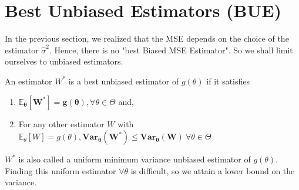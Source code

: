 \documentclass[12pt]{report}
\begin{document}
\section{Best Unbiased Estimators (BUE)}
In the previous section, we realized that the MSE depends on the choice of the estimator $\hat{\sigma}^2$. Hence, there is no "best Biased MSE Estimator". So we shall limit ourselves to unbiased estimators.


\begin{defn}
An estimator $W^*$ is a best unbiased estimator of $g(\theta)$ if it satisfies 
\begin{enumerate}
\item $\bm{\mathbb{E}_\theta[W^*] = g(\theta)}, \forall \theta \in \Theta$ and,
\item For any other estimator $W$ with $\mathbb{E}_\theta[W] = g(\theta), \bm{Var_\theta(W^*) \leq Var_\theta(W)} \ \forall  \theta  \in  \Theta$
\end{enumerate}
\begin{note}
$W^*$ is also called a uniform minimum variance unbiased estimator of $g(\theta)$. Finding this uniform estimator $\forall \theta$ is difficult, so we attain a lower bound on the variance.
\end{note}
\end{defn}
\end{document}
